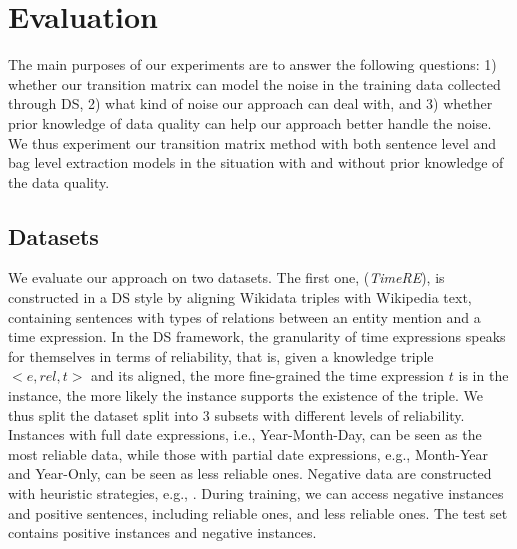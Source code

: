 \section{Evaluation}
The main purposes of our experiments are to answer the following questions: 1) whether our transition matrix can model the noise in the training data collected through DS, 2) what kind of noise our approach can deal with, and 3) whether prior knowledge of data quality can help our approach better handle the noise.  
We thus experiment our transition matrix method with both sentence level and bag level extraction models in the situation with and without prior knowledge of the data quality. 
\subsection{Datasets}
We evaluate our approach on two datasets. 
The first one, (\emph{TimeRE}), is %
constructed in a DS style by aligning Wikidata triples with Wikipedia text,  containing  sentences with  types of relations  between an entity mention and a time expression.  In the DS framework,   the granularity of time expressions speaks for themselves in terms of reliability, that is, given a knowledge triple $<e, rel, t>$ and its aligned,  the more fine-grained the time expression $t$ is in the instance, the more likely the instance  supports the existence of the triple.    We thus split the dataset  split into 3 subsets with different levels of reliability. Instances with full date expressions, i.e.,  Year-Month-Day, can be seen as the most reliable data, while those with partial date expressions, e.g., Month-Year and Year-Only, can be seen as less reliable ones.  Negative data are constructed with heuristic strategies, e.g.,  . 
During training, we can access   negative instances and   positive sentences, including  reliable ones,  and  less reliable ones. The test set contains  positive instances and  negative instances.

